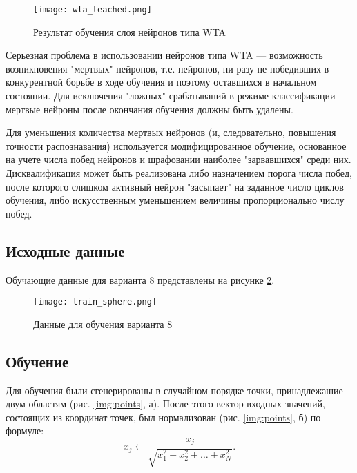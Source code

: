 \begin{figure}[H]
\centering
\texttt{[image: wta\_teached.png]}
\caption{Результат обучения слоя нейронов типа WTA}
\label{img:wta_teached}
\end{figure}

Серьезная проблема в использовании нейронов типа WTA — возможность возникновения "мертвых" нейронов, т.е. нейронов, ни разу не победивших в конкурентной борьбе в ходе обучения и поэтому оставшихся в начальном состоянии. Для исключения "ложных" срабатываний в режиме классификации мертвые нейроны после окончания обучения должны быть удалены.

Для уменьшения количества мертвых нейронов (и, следовательно, повышения точности распознавания) используется модифицированное обучение, основанное на учете числа побед нейронов и шрафовании наиболее "зарвавшихся" среди них. Дисквалификация может быть реализована либо назначением порога числа побед, после которого слишком активный нейрон "засыпает" на заданное число циклов обучения, либо искусственным уменьшением величины  пропорционально числу побед.



\subsection{Исходные данные}

Обучающие данные для варианта 8 представлены на рисунке \ref{img:train_sphere}.

\begin{figure}[H]
\centering
\texttt{[image: train\_sphere.png]}
\caption{Данные для обучения варианта 8}
\label{img:train_sphere}
\end{figure}

\subsection{Обучение}

Для обучения были сгенерированы в случайном порядке точки, принадлежашие двум областям (рис. \ref{img:points}, а). После этого вектор входных значений, состоящих из координат точек, был нормализован (рис. \ref{img:points}, б) по формуле:
\begin{equation}\label{eq:normaFunc}
	x_{j}\leftarrow\frac{x_{j}}{\sqrt{x_{1}^{2}+x_{2}^{2}+\ldots+x_{N}^{2}}}.
\end{equation}

